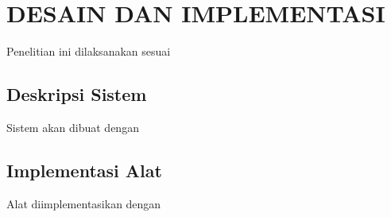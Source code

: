 \chapter{DESAIN DAN IMPLEMENTASI}
\label{chap:desainimplementasi}


Penelitian ini dilaksanakan sesuai \lipsum[1][1-5]

\section{Deskripsi Sistem}
\label{sec:deskripsisistem}

Sistem akan dibuat dengan \lipsum[1-2]

\section{Implementasi Alat
  \label{sec:implementasi alat}}

Alat diimplementasikan dengan \lipsum[1]

\lipsum[2-3]



\lipsum[4]
